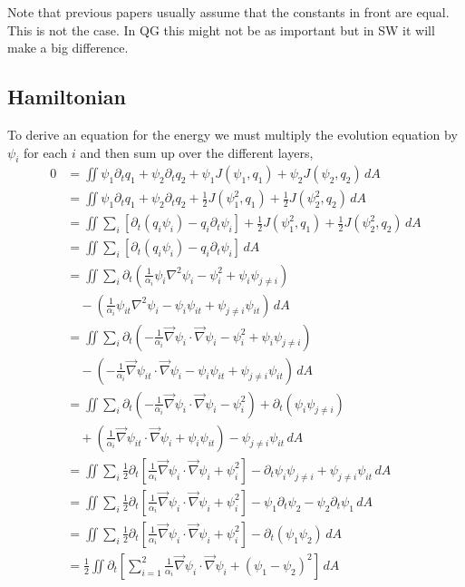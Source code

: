 \documentclass[12pt]{article}
\begin{document}
Note that previous papers usually assume that the constants in front are equal. This is not the case.  In QG this might not be as important but in SW it will make a big difference.

\subsection{Hamiltonian}

To derive an equation for the energy we must multiply the evolution equation by $\psi_i$ for each $i$ and then sum up over the different layers,
\begin{align*}
0 &= \iint \psi_1 \partial_t q_1 + \psi_2 \partial_t q_2 + \psi_1 J(\psi_1, q_1) + \psi_2 J(\psi_2, q_2) \, dA \\
 &= \iint \psi_1 \partial_t q_1 + \psi_2 \partial_t q_2 + \frac12 J(\psi_1^2, q_1) + \frac12 J(\psi_2^2, q_2) \, dA \\
 &= \iint \sum_i \left[\partial_t(q_i \psi_i) - q_i \partial_t\psi_i \right] + \frac12 J(\psi_1^2, q_1) + \frac12 J(\psi_2^2, q_2) \, dA \\
 &= \iint \sum_i \left[\partial_t(q_i \psi_i) - q_i \partial_t\psi_i \right] \, dA \\
 &= \iint \sum_i \partial_t \left (\frac{1}{\alpha_i}\psi_i \nabla^2 \psi_i - \psi_i^2 + \psi_i\psi_{j\ne i} \right) \\
  &\quad - \left( \frac{1}{\alpha_i} \psi_{it} \nabla^2 \psi_i - \psi_i \psi_{it} + \psi_{j \ne i} \psi_{it} \right) \, dA \\
 &= \iint \sum_i \partial_t \left (-\frac{1}{\alpha_i} \vec\nabla \psi_i \cdot \vec\nabla \psi_i - \psi_i^2 + \psi_i\psi_{j\ne i} \right) \\
  &\quad - \left( -\frac{1}{\alpha_i} \vec\nabla \psi_{it} \cdot \vec\nabla \psi_i - \psi_i \psi_{it} + \psi_{j \ne i} \psi_{it} \right) \, dA \\
 &= \iint \sum_i \partial_t \left (-\frac{1}{\alpha_i} \vec\nabla \psi_i \cdot \vec\nabla \psi_i - \psi_i^2 \right) + \partial_t (\psi_i\psi_{j\ne i})  \\
  &\quad + \left( \frac{1}{\alpha_i} \vec\nabla \psi_{it} \cdot \vec\nabla \psi_i + \psi_i \psi_{it} \right) - \psi_{j \ne i} \psi_{it} \, dA \\
 &= \iint \sum_i \frac12 \partial_t \left[ \frac{1}{\alpha_i} \vec\nabla \psi_i \cdot \vec\nabla \psi_i + \psi_i^2 \right] - \partial_t \psi_i\psi_{j\ne i} + \psi_{j \ne i} \psi_{it} \, dA \\
 &= \iint  \sum_i \frac12 \partial_t \left[ \frac{1}{\alpha_i} \vec\nabla \psi_i \cdot  \vec\nabla \psi_i + \psi_i^2 \right] - \psi_1 \partial_t \psi_2  -  \psi_2 \partial_t \psi_1\, dA \\
 &= \iint  \sum_i \frac12 \partial_t \left[ \frac{1}{\alpha_i} \vec\nabla \psi_i \cdot  \vec\nabla \psi_i + \psi_i^2 \right] -  \partial_t (\psi_1\psi_2)\, dA \\
 &= \frac12 \iint \partial_t \left[ \sum_{i=1}^2 \frac{1}{\alpha_i} \vec\nabla \psi_i \cdot \vec\nabla \psi_i + (\psi_1 - \psi_2)^2 \right]\, dA
\end{align*}
\end{document}
